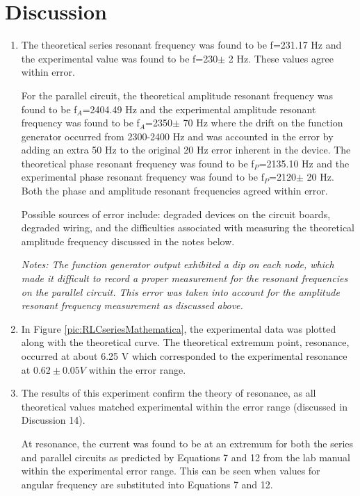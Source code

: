 \section{Discussion}
\begin{enumerate}[resume]
\item The theoretical series resonant frequency was found to be f=231.17 Hz and the experimental value was found to be f=230$\pm$ 2 Hz. These values agree within error. 

For the parallel circuit, the theoretical amplitude resonant frequency was found to be f$_A$=2404.49 Hz and the experimental amplitude resonant frequency was found to be f$_A$=2350$\pm$ 70 Hz where the drift on the function generator occurred from 2300-2400 Hz and was accounted in the error by adding an extra 50 Hz to the original 20 Hz error inherent in the device. The theoretical phase resonant frequency was found to be f$_P$=2135.10 Hz and the experimental phase resonant frequency was found to be f$_P$=2120$\pm$ 20 Hz. Both the phase and amplitude resonant frequencies agreed within error.

Possible sources of error include: degraded devices on the circuit boards, degraded wiring, and the difficulties associated with measuring the theoretical amplitude frequency discussed in the notes below.

\textit{Notes: The function generator output exhibited a dip on each node, which made it difficult to record a proper measurement for the resonant frequencies on the parallel circuit. This error was taken into account for the amplitude resonant frequency measurement as discussed above.}
\item In Figure \ref{pic:RLCseriesMathematica}, the experimental data was plotted along with the theoretical curve. The theoretical extremum point, resonance, occurred at about 6.25 V which corresponded to the experimental resonance at $0.62\pm0.05 V$ within the error range. 
\item The results of this experiment confirm the theory of resonance, as all theoretical values matched experimental within the error range (discussed in Discussion 14).

At resonance, the current was found to be at an extremum for both the series and parallel circuits as predicted by Equations 7 and 12 from the lab manual within the experimental error range. This can be seen when values for angular frequency are substituted into Equations 7 and 12.

\end{enumerate}



